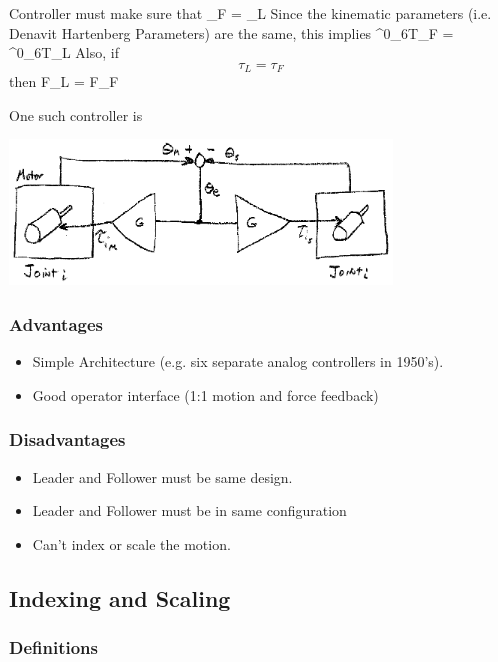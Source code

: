 Controller must make sure that
\bq
\theta_F = \theta_L
\eq
Since the kinematic parameters (i.e. Denavit Hartenberg Parameters) are the same, this implies
\bq
^0_6T_F = ^0_6T_L
\eq
Also, if
\[
\tau_L = \tau_F
\]
then
\bq
F_L = F_F
\eq

One such controller is

\includegraphics[width=4.0in]{figs14/00403.eps}



\subsubsection*{Advantages}
\begin{itemize}
   \item Simple Architecture (e.g. six separate analog controllers in 1950's).
   \item Good operator interface (1:1 motion and force feedback)
\end{itemize}

\subsubsection*{Disadvantages}
\begin{itemize}
   \item Leader and Follower must be same design.
   \item Leader and Follower must be in same configuration
   \item Can't index or scale the motion.
\end{itemize}


\subsection{Indexing and Scaling}
\subsubsection{Definitions}

